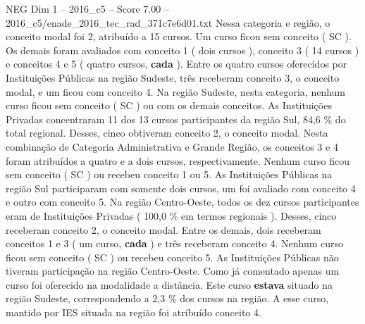 \begin{textsample}{NEG Dim 1 – 2016\_c5 – Score 7.00 – 2016\_c5/enade\_2016\_tec\_rad\_371c7e6d01.txt}
Nessa categoria e região, o conceito modal foi 2, atribuído a 15 cursos.
Um curso ficou sem conceito ( SC ).
Os demais foram avaliados com conceito 1 ( dois cursos ), conceito 3 ( 14 cursos ) e conceitos 4 e 5 ( quatro cursos, \textbf{cada} ).
Entre os quatro cursos oferecidos por Instituições Públicas na região Sudeste, três receberam conceito 3, o conceito modal, e um ficou com conceito 4.
Na região Sudeste, nesta categoria, nenhum curso ficou sem conceito ( SC ) ou com os demais conceitos.
As Instituições Privadas concentraram 11 dos 13 cursos participantes da região Sul, 84,6 \% do total regional.
Desses, cinco obtiveram conceito 2, o conceito modal.
Nesta combinação de Categoria Administrativa e Grande Região, os conceitos 3 e 4 foram atribuídos a quatro e a dois cursos, respectivamente.
Nenhum curso ficou sem conceito ( SC ) ou recebeu conceito 1 ou 5.
As Instituições Públicas na região Sul participaram com somente dois cursos, um foi avaliado com conceito 4 e outro com conceito 5.
Na região Centro-Oeste, todos os dez cursos participantes eram de Instituições Privadas ( 100,0 \% em termos regionais ).
Desses, cinco receberam conceito 2, o conceito modal.
Entre os demais, dois receberam conceitos 1 e 3 ( um curso, \textbf{cada} ) e três receberam conceito 4.
Nenhum curso ficou sem conceito ( SC ) ou recebeu conceito 5.
As Instituições Públicas não tiveram participação na região Centro-Oeste.
Como já comentado apenas um curso foi oferecido na modalidade a distância.
Este curso \textbf{estava} situado na região Sudeste, correspondendo a 2,3 \% dos cursos na região.
A esse curso, mantido por IES situada na região foi atribuído conceito 4.

\end{textsample}
